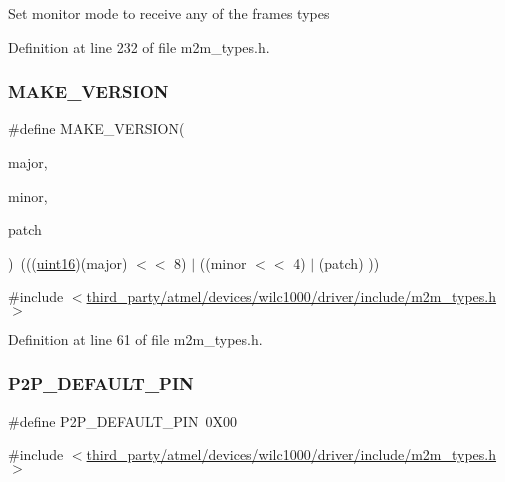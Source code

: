 Set monitor mode to receive any of the frames types 

Definition at line 232 of file m2m\+\_\+types.\+h.

\mbox{\label{group__WlanDefines_gaedb42f7681d2a954c9ada2752b362544}} 
\subsubsection{\texorpdfstring{M\+A\+K\+E\+\_\+\+V\+E\+R\+S\+I\+ON}{MAKE\_VERSION}}
{\footnotesize\ttfamily \#define M\+A\+K\+E\+\_\+\+V\+E\+R\+S\+I\+ON(\begin{DoxyParamCaption}\item[{}]{major,  }\item[{}]{minor,  }\item[{}]{patch }\end{DoxyParamCaption})~(((\hyperlink{group__DataT_ga1daa745171fc6e31d942c161422a76f9}{uint16})(major) $<$$<$ 8) $\vert$ ((minor $<$$<$ 4) $\vert$ (patch) ))}



{\ttfamily \#include $<$\hyperlink{m2m__types_8h}{third\+\_\+party/atmel/devices/wilc1000/driver/include/m2m\+\_\+types.\+h}$>$}



Definition at line 61 of file m2m\+\_\+types.\+h.

\mbox{\label{group__WlanDefines_ga1f3f079b198595a55feb27f45dd308c7}} 
\subsubsection{\texorpdfstring{P2\+P\+\_\+\+D\+E\+F\+A\+U\+L\+T\+\_\+\+P\+IN}{P2P\_DEFAULT\_PIN}}
{\footnotesize\ttfamily \#define P2\+P\+\_\+\+D\+E\+F\+A\+U\+L\+T\+\_\+\+P\+IN~0\+X00}



{\ttfamily \#include $<$\hyperlink{m2m__types_8h}{third\+\_\+party/atmel/devices/wilc1000/driver/include/m2m\+\_\+types.\+h}$>$}



